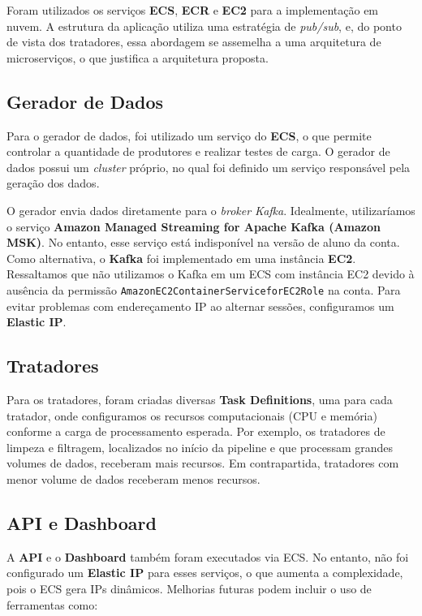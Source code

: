 \documentclass[a4paper,12pt]{article}
\begin{document}
Foram utilizados os serviços \textbf{ECS}, \textbf{ECR} e \textbf{EC2} para a implementação em nuvem. A estrutura da aplicação utiliza uma estratégia de \textit{pub/sub}, e, do ponto de vista dos tratadores, essa abordagem se assemelha a uma arquitetura de microserviços, o que justifica a arquitetura proposta.

\subsection{Gerador de Dados}

Para o gerador de dados, foi utilizado um serviço do \textbf{ECS}, o que permite controlar a quantidade de produtores e realizar testes de carga. O gerador de dados possui um \textit{cluster} próprio, no qual foi definido um serviço responsável pela geração dos dados.

O gerador envia dados diretamente para o \textit{broker Kafka}. Idealmente, utilizaríamos o serviço \textbf{Amazon Managed Streaming for Apache Kafka (Amazon MSK)}. No entanto, esse serviço está indisponível na versão de aluno da conta. Como alternativa, o \textbf{Kafka} foi implementado em uma instância \textbf{EC2}. Ressaltamos que não utilizamos o Kafka em um ECS com instância EC2 devido à ausência da permissão \texttt{AmazonEC2ContainerServiceforEC2Role} na conta. Para evitar problemas com endereçamento IP ao alternar sessões, configuramos um \textbf{Elastic IP}.

\subsection{Tratadores}

Para os tratadores, foram criadas diversas \textbf{Task Definitions}, uma para cada tratador, onde configuramos os recursos computacionais (CPU e memória) conforme a carga de processamento esperada. Por exemplo, os tratadores de limpeza e filtragem, localizados no início da pipeline e que processam grandes volumes de dados, receberam mais recursos. Em contrapartida, tratadores com menor volume de dados receberam menos recursos.

\subsection{API e Dashboard}

A \textbf{API} e o \textbf{Dashboard} também foram executados via ECS. No entanto, não foi configurado um \textbf{Elastic IP} para esses serviços, o que aumenta a complexidade, pois o ECS gera IPs dinâmicos. Melhorias futuras podem incluir o uso de ferramentas como:
\end{document}
